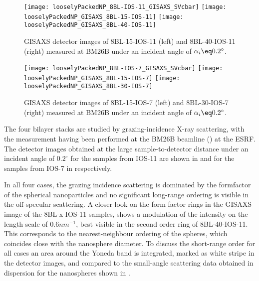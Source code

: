 \documentclass[\main/dresen_thesis.tex]{subfiles}
\begin{document}
  \label{sec:looselyPackedNS:bilayerStacks:gisaxs}
  \begin{figure}[tb]
    \centering
    \texttt{[image: looselyPackedNP\_8BL-IOS-11\_GISAXS\_SVcbar]}
    \texttt{[image: looselyPackedNP\_GISAXS\_8BL-15-IOS-11]}
    \texttt{[image: looselyPackedNP\_GISAXS\_8BL-40-IOS-11]}
    \caption{\label{fig:looselyPackedNP:bilayerStacks:gisaxs8BL_IOS_11}GISAXS detector images of 8BL-15-IOS-11 (left)  and 8BL-40-IOS-11 (right) measured at BM26B under an incident angle of $\alpha_i \eq 0.2 ^\circ$.}
  \end{figure}

  \begin{figure}[tb]
    \centering
    \texttt{[image: looselyPackedNP\_8BL-IOS-7\_GISAXS\_SVcbar]}
    \texttt{[image: looselyPackedNP\_GISAXS\_8BL-15-IOS-7]}
    \texttt{[image: looselyPackedNP\_GISAXS\_8BL-30-IOS-7]}
    \caption{\label{fig:looselyPackedNP:bilayerStacks:gisaxs8BL_IOS_7}GISAXS detector images of 8BL-15-IOS-7 (left)  and 8BL-30-IOS-7 (right) measured at BM26B under an incident angle of $\alpha_i \eq 0.2 ^\circ$.}
  \end{figure}

  The four bilayer stacks are studied by grazing-incidence X-ray scattering, with the measurement having been performed at the BM26B beamline () at the ESRF.
  The detector images obtained at the large sample-to-detector distance under an incident angle of $0.2 ^\circ$ for the samples from IOS-11 are shown in  and for the samples from IOS-7 in  respectively.

  In all four cases, the grazing incidence scattering is dominated by the formfactor of the spherical nanoparticles and no significant long-range ordering is visible in the off-specular scattering.
  A closer look on the form factor rings in the GISAXS image of the 8BL-x-IOS-11 samples, shows a modulation of the intensity on the length scale of $0.6 \unit{nm^{-1}}$, best visible in the second order ring of 8BL-40-IOS-11.
  This corresponds to the nearest-neighbour ordering of the spheres, which coincides close with the nanosphere diameter.
  To discuss the short-range order for all cases an area around the Yoneda band is integrated, marked as white stripe in the detector images, and compared to the small-angle scattering data obtained in dispersion for the nanospheres shown in .
\end{document}
